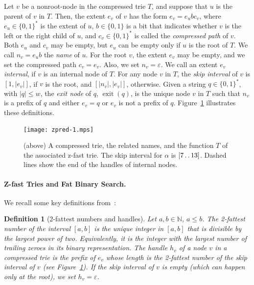 \documentclass[a4paper,11pt]{article}
\newtheorem{definition}[theorem]{Definition}
\newcommand{\eps}{\varepsilon}
\newcommand{\N}{\mathbb{N}}
\newcommand{\?}{\mskip1.5mu}
\def\..{\,\mathpunct{\ldotp\ldotp}} %
\DeclareMathOperator{\exit}{exit}
\begin{document}
Let $v$ be a nonroot-node in the compressed trie $T$,
and suppose that $u$ is the parent of $v$ in $T$. Then, 
the extent $e_v$ of $v$ has the form $e_v = e_ubc_v$, 
where $e_u \in \{0, 1\}^*$ is the extent of $u$, $b \in \{0,1\}$ is 
a bit that indicates whether $v$ is the left or the right child
of $u$, and $c_v \in \{0, 1\}^*$ is called the \emph{compressed
path} of $v$. Both $e_u$ and $c_v$ may be empty, but $e_u$
can be empty only if $u$ is the root of $T$. 
We call $n_v = e_ub$ the \emph{name} of $u$.
For the root $v$, the extent $e_v$ may be empty, and we set
the compressed path $c_v = e_v$. Also, we set $n_v = \eps$.
We call an extent $e_v$ \emph{internal}, if $v$ is an internal
node of $T$.
For any node $v$ in $T$, the \emph{skip interval} of $v$ is 
$[1, |e_v|]$, if $v$ is the root, and $[|n_v|, |e_v|]$, otherwise.
Given a string $q \in \{0, 1\}^*$, with $|q| \leq w$, the 
\emph{exit node} of $q$, $\exit(q)$, is the unique node
$v$ in $T$ such that $n_v$ is a prefix of $q$ and either
$e_v = q$ or $e_v$ is not a prefix of $q$.
Figure~\ref{fig:ztrie} illustrates these definitions.

\begin{figure}[t]
\centering
\texttt{[image: zpred-1.mps]}\qquad{}
\caption{(above) A compressed trie, the 
related names, and the function $T$ of the associated 
z-fast trie. The skip interval for $\alpha$ is $[7\..13]$. 
Dashed lines show the end of the handles of internal nodes.}
\label{fig:ztrie}
\end{figure}

\paragraph{Z-fast Tries and Fat Binary Search.}
We recall some key definitions from~\cite{BelazzouguiBoPaVi09}:

\begin{definition}[2-fattest numbers and handles] 
\label{def:twofattest}
Let $a, b \in \N$, $a \leq b$. The \emph{2-fattest number} 
of the interval $[a, b]$ is the unique integer in $[a, b]$ 
that is divisible by the largest power of two. Equivalently, 
it is the integer with the largest number of trailing zeroes 
in its binary representation. The \emph{handle} $h_v$ of a 
node $v$ in a compressed trie is the prefix of $e_v$ whose 
length is the 2-fattest number of the skip interval of $v$
(see Figure~\ref{fig:ztrie}). If the skip interval of $v$ 
is empty (which can happen only at the root), we set 
$h_v = \eps$.
\end{definition}
\end{document}
